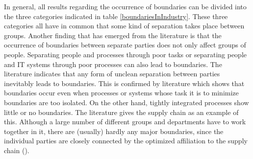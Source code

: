 In general, all results regarding the occurrence of boundaries can be divided into the three categories indicated in table \ref{boundariesInIndustry}. These three categories all have in common that some kind of separation takes place between groups. Another finding that has emerged from the literature is that the occurrence of boundaries between separate parties does not only affect groups of people. Separating people and processes through poor tasks or separating people and IT systems through poor processes can also lead to boundaries. The literature indicates that any form of unclean separation between parties inevitably leads to boundaries. This is confirmed by literature which shows that boundaries occur even when processes or systems whose task it is to minimize boundaries are too isolated. On the other hand, tightly integrated processes show little or no boundaries. The literature gives the supply chain as an example of this. Although a large number of different groups and departments have to work together in it, there are (usually) hardly any major boundaries, since the individual parties are closely connected by the optimized affiliation to the supply chain (\cite{Chen.2021}).


